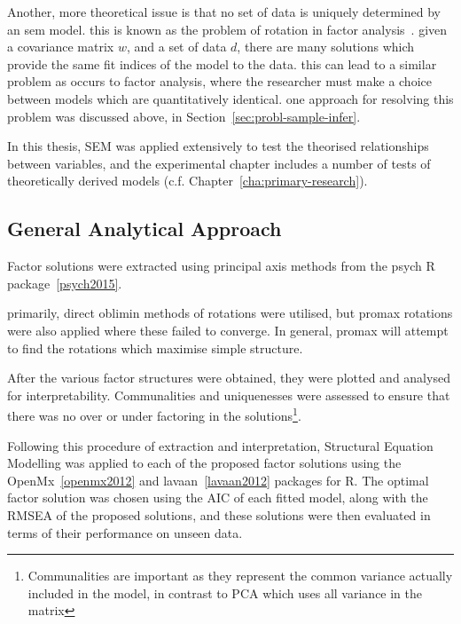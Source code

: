 Another, more theoretical issue is that no set of data is uniquely determined by an sem model. this is known as the problem of rotation in factor analysis~\cite{maccallum2000applications}. given a covariance matrix $w$, and a set of data $d$, there are many solutions which provide the same fit indices of the model to the data. this can lead to a similar problem as occurs to factor analysis, where the researcher must make a choice between models which are quantitatively identical. one approach for resolving this problem was discussed above, in Section~\ref{sec:probl-sample-infer}.

In this thesis, SEM was applied extensively to test the theorised relationships between variables, and the experimental chapter includes a number of tests of theoretically derived models (c.f. Chapter~\ref{cha:primary-research}).

\subsection{General Analytical Approach}
\label{sec:gener-analyt-appr}


Factor solutions were extracted using principal axis methods from the psych R package~\ref{psych2015}.

primarily, direct oblimin methods of rotations were utilised, but promax rotations were also applied where these failed to converge. In general, promax will attempt to find the rotations which maximise simple structure. 

After the various factor structures were obtained, they were plotted and analysed for interpretability. Communalities and uniquenesses were assessed to ensure that there was no over or under factoring in the solutions\footnote{Communalities are important as they represent the common variance actually included in the model, in contrast to PCA which uses all variance in the matrix}. %

Following this procedure of extraction and interpretation, Structural Equation Modelling was applied to each of the proposed factor solutions using the OpenMx~\ref{openmx2012} and lavaan~\ref{lavaan2012} packages for R. The optimal factor solution was chosen using the AIC of each fitted model, along with the RMSEA of the proposed solutions, and these solutions were then evaluated in terms of their performance on unseen data. 



